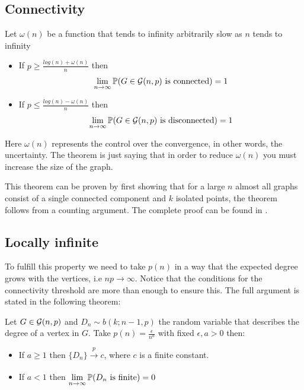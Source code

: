 \subsection{Connectivity}
\begin{theorem}\label{connectivityER}
Let $\omega(n)$ be a function that tends to infinity arbitrarily slow as $n$ tends to infinity
\begin{itemize}
\item If $p\geq \frac{log(n)+ \omega(n)}{n}$ then 
$$\lim_{n \to \infty} \P(G \in \G(n,p) \text{ is connected}) = 1$$
\item If $p\leq \frac{log(n)- \omega(n)}{n}$ then
$$\lim_{n \to \infty} \P(G \in \G(n,p) \text{ is disconnected}) = 1$$
\end{itemize}
\end{theorem}

Here $\omega(n)$ represents the control over the convergence, in other words, the uncertainty. The theorem is just saying that in order to reduce $\omega(n)$ you must increase the size of the graph.

This theorem can be proven by first showing that for a large $n$ almost all graphs consist of a single connected component and $k$ isolated points, the theorem follows from a counting argument. The complete proof can be found in \cite[Erdös-Rényi, p.~59]{Erdos59}.
 
\subsection{Locally infinite}

To fulfill this property we need to take $p(n)$ in a way that the expected degree grows with the vertices, i.e $n p\to \infty$. Notice that the conditions for the connectivity threshold are more than enough to ensure this. The full argument is stated in the following theorem:

\begin{theorem}\label{locallyInfiniteER}
Let $G \in \G(n,p)$ and $D_{n} \sim b(k; n-1,p)$ the random variable that describes the degree of a vertex in $G$. Take $p(n)=\frac{\epsilon}{n^{a}}$ with fixed $\epsilon,a >0$ then:
\begin{itemize}
    \item If $a\geq 1$ then $\{D_{n}\} \xrightarrow[]{p} c $, where $c$ is a finite constant.
    \item If $a<1$ then $\lim\limits_{n \to \infty} \P(D_n \text{ is finite}) = 0$
\end{itemize}
\end{theorem}

